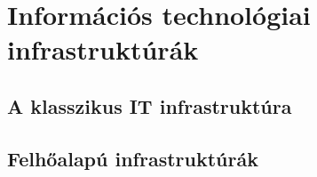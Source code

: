 \chapter{Információs technológiai infrastruktúrák}
\section{A klasszikus IT infrastruktúra}
\section{Felhőalapú infrastruktúrák}
